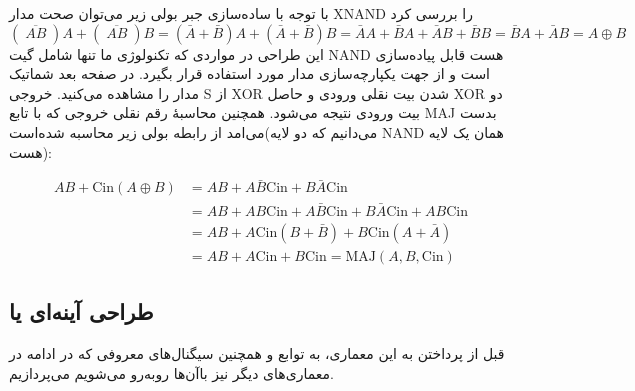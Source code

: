با توجه با ساده‌سازی جبر بولی زیر می‌توان صحت مدار XNAND را بررسی کرد
$$(\; \overline{AB}\;)A + (\;\overline{AB}\;)B = (\bar{A}+\bar{B})A + (\bar{A}+\bar{B})B = \bar{A}A + \bar{B}A + \bar{A}B + \bar{B}B = \bar{B}A + \bar{A}B = A\oplus B$$
این طراحی در مواردی که تکنولوژی ما تنها شامل گیت NAND هست قابل پیاده‌سازی است و از جهت یکپارچه‌سازی مدار مورد استفاده قرار بگیرد.
در صفحه بعد شماتیک مدار را مشاهده می‌کنید. خروجی S از XOR شدن بیت نقلی ورودی و حاصل XOR دو بیت ورودی نتیجه می‌شود. همچنین محاسبۀ رقم نقلی خروجی که با تابع MAJ بدست می‌امد از رابطه بولی زیر محاسبه شده‌است(می‌دانیم که دو لایه NAND همان یک لایه  هست):

$$
    \begin{aligned}
        AB + \text{Cin}(A\oplus B) & = AB + A\bar{B}\text{Cin} + B\bar{A}\text{Cin}                               \\
                                   & = AB + AB\text{Cin} + A\bar{B}\text{Cin} + B\bar{A}\text{Cin} + AB\text{Cin} \\
                                   & = AB + A\text{Cin}( B + \bar{B}) + B\text{Cin}( A + \bar{A})                 \\
                                   & = AB + A\text{Cin} + B\text{Cin} = \text{MAJ}(A,B,\text{Cin})
    \end{aligned}
$$






\newpage

\subsection{
    طراحی آینه‌ای یا
}

قبل از پرداختن به این معماری، به توابع  و همچنین سیگنال‌های معروفی که در ادامه در معماری‌های دیگر نیز باآن‌ها روبه‌رو می‌شویم می‌پردازیم.

